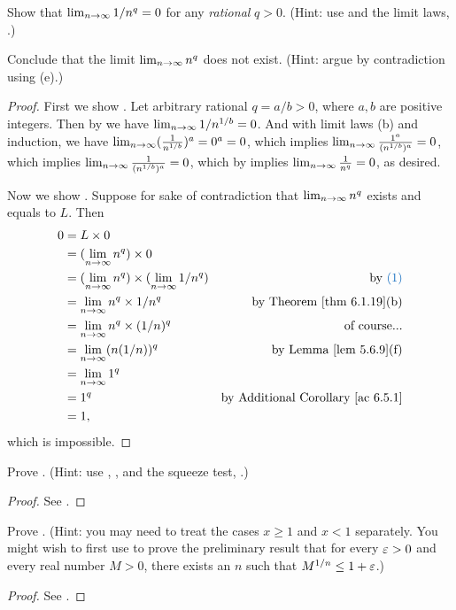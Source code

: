 \exercisesection

\begin{exercise} \label{exercise 6.5.1}
 Show that \(\lim_{n \to \infty} 1/n^q = 0\) for any \emph{rational} \(q > 0\).
(Hint: use  and the limit laws, .)

 Conclude that the limit \(\lim_{n \to \infty} n^q\) does not exist.
(Hint: argue by contradiction using (e).)
\end{exercise}

\begin{proof}
First we show .
Let arbitrary rational \(q = a/b > 0\), where \(a, b\) are positive integers.
Then by  we have \(\lim_{n \to \infty} 1/n^{1/b} = 0\).
And with limit laws (b) and induction, we have \(\lim_{n \to \infty} (\frac1{n^{1/b}})^a = 0^a = 0\),
which implies \(\lim_{n \to \infty} \frac{1^a}{(n^{1/b})^a} = 0\),
which implies \(\lim_{n \to \infty} \frac1{(n^{1/b})^a} = 0\),
which by  implies \(\lim_{n \to \infty} \frac1{n^q} = 0\), as desired.

Now we show .
Suppose for sake of contradiction that \(\lim_{n \to \infty} n^q\) exists and equals to \(L\).
Then
\begin{align*}
    0 & = L \X 0 \\
      & = (\lim_{n \toINF} n^q) \X 0 \\
      & = (\lim_{n \toINF} n^q) \X (\lim_{n \toINF} 1/n^q) & \text{by \BLUE{(1)}} \\
      & = \lim_{n \toINF} n^q \X 1/n^q & \text{by \THM{6.1.19}(b)} \\
      & = \lim_{n \toINF} n^q \X (1/n)^q & \text{of course...} \\
      & = \lim_{n \toINF} (n(1/n))^q & \text{by \LEM{5.6.9}(f)} \\
      & = \lim_{n \toINF} 1^q \\
      & = 1^q & \text{by \AC{6.5.1}} \\
      & = 1,
\end{align*}
which is impossible.
\end{proof}

\begin{exercise} \label{exercise 6.5.2}
Prove .
(Hint: use , , and the squeeze test, .)
\end{exercise}

\begin{proof}
See .
\end{proof}

\begin{exercise} \label{exercise 6.5.3}
Prove .
(Hint: you may need to treat the cases \(x \ge 1\) and \(x < 1\) separately.
You might wish to first use  to prove the preliminary result that for every \(\varepsilon > 0\) and every real number \(M > 0\), there exists an \(n\) such that \(M^{1/n} \le 1 + \varepsilon\).)
\end{exercise}

\begin{proof}
See .
\end{proof}
